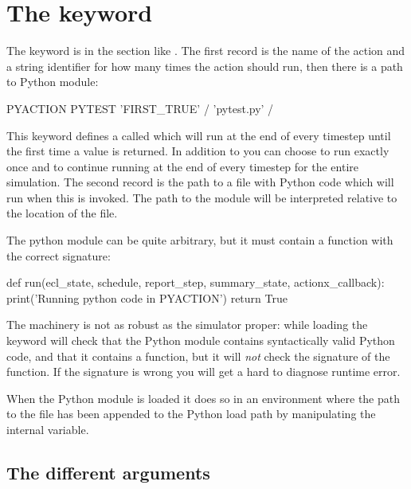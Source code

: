 \section{The \pyaction{} keyword}
The \pyaction{} keyword is in the  section like \actionx{}. The
first record is the name of the action and a string identifier for how many
times the action should run, then there is a path to Python module:

\begin{deck}
PYACTION
  PYTEST 'FIRST_TRUE' /
  'pytest.py' /
\end{deck}

This keyword defines a \pyaction{} called  which will run at the end
of every timestep until the first time a  value is returned. In
addition to  you can choose  to run exactly once and
 to continue running at the end of every timestep for the entire
simulation. The second record is the path to a file with Python code which will
run when this \pyaction{} is invoked. The path to the module will be interpreted
relative to the location of the  file.

The python module can be quite arbitrary, but it must contain a function
 with the correct signature:
\begin{code}
def run(ecl_state, schedule, report_step, summary_state, actionx_callback):
    print('Running python code in PYACTION')
    return True
\end{code}
The \pyaction{} machinery is not as robust as the simulator proper: while
loading the  keyword \flow{} will check that the Python module
contains syntactically valid Python code, and that it contains a
 function, but it will \emph{not} check the signature of the
 function. If the signature is wrong you will get a hard to
diagnose runtime error.

When the Python module is loaded it does so in an environment where the path to
the  file has been appended to the Python load path by manipulating
the internal  variable.

 
\subsection{The different arguments}


